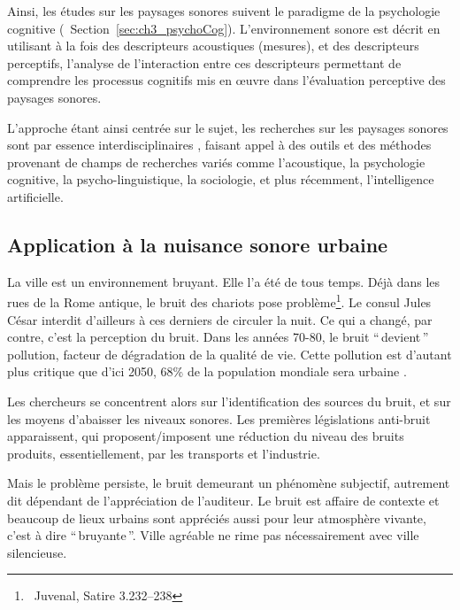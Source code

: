 {Ainsi, les études sur les paysages sonores suivent le paradigme de la psychologie cognitive \citep{dubois2006cognitive,maffiolo_caracterisation_1999} (\cf~Section~\ref{sec:ch3_psychoCog}). L'environnement sonore est décrit en utilisant à la fois des descripteurs acoustiques (mesures), et des descripteurs perceptifs, l'analyse de l'interaction entre ces descripteurs permettant de comprendre les processus cognitifs mis en œuvre dans l'évaluation perceptive des paysages sonores.

L'approche étant ainsi centrée sur le sujet, les recherches sur les paysages sonores sont par essence interdisciplinaires \citep{davies2013perception,aletta2016soundscape}, faisant appel à des outils et des méthodes provenant de champs de recherches variés comme l'acoustique, la psychologie cognitive, la psycho-linguistique, la sociologie, et plus récemment, l’intelligence artificielle.

\subsection{Application à la nuisance sonore urbaine}
\label{sec:ch3_urbanNoiseSoundscape}

La ville est un environnement bruyant. Elle l'a été de tous temps. Déjà dans les rues de la Rome antique, le bruit des chariots pose problème\footnote{\cf~Juvenal, Satire 3.232–238}. Le consul Jules César interdit d'ailleurs à ces derniers de circuler la nuit. Ce qui a changé, par contre, c'est la perception du bruit. Dans les années 70-80, le bruit ``\,devient\,'' pollution, facteur de dégradation de la qualité de vie. Cette pollution est d'autant plus critique que d'ici 2050, 68\% de la population mondiale sera urbaine \citep{park14}.

Les chercheurs se concentrent alors sur l'identification des sources du bruit, et sur les moyens d'abaisser les niveaux sonores. Les premières législations anti-bruit apparaissent, qui proposent/imposent une réduction du niveau des bruits produits, essentiellement, par les transports et l'industrie.

Mais le problème persiste, le bruit demeurant un phénomène subjectif, autrement dit dépendant de l'appréciation de l'auditeur. Le bruit est affaire de contexte et beaucoup de lieux urbains sont appréciés aussi pour leur atmosphère vivante, c'est à dire ``\,bruyante\,''. Ville agréable ne rime pas nécessairement avec ville silencieuse.

}

